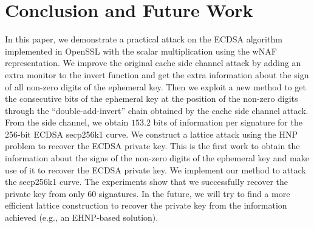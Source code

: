 \section{Conclusion and Future Work}
\label{sec:conclusion}
In this paper, we demonstrate a practical attack on the ECDSA algorithm implemented in OpenSSL with the scalar multiplication using the wNAF representation.
We improve the original cache side channel attack
 by adding an extra monitor to the invert function and get the extra information about the sign of all non-zero digits of the ephemeral key.
Then we exploit a new method to get the consecutive bits of the ephemeral key at the position of the non-zero digits through the ``double-add-invert'' chain obtained by the cache side channel attack.
From the side channel, we obtain $153.2$ bits of information per signature for the 256-bit ECDSA secp256k1 curve.
We construct a lattice attack using the HNP problem to recover the ECDSA private key.
This is the first work to obtain the information about the signs of the non-zero digits of the ephemeral key and make use of it to recover the ECDSA private key.
We implement our method to attack the secp256k1 curve.
The experiments show that we successfully recover the private key from only $60$ signatures.
In the future,
 we will try to find a more efficient lattice construction to recover the private key
    from the information achieved (e.g., an EHNP-based solution).


